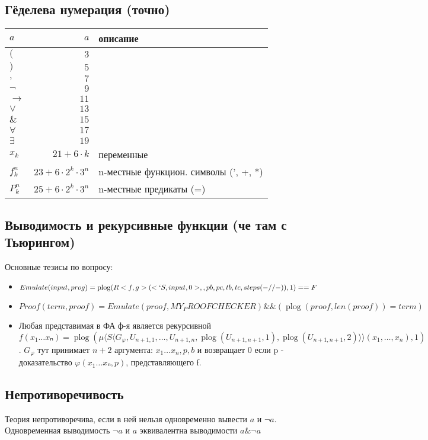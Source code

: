 \documentclass[12pt]{article}
\newcommand{\levayahuynya}{{\unicodefont \textopencorner}}
\newcommand{\pravayahuynya}{{\unicodefont \textcorner}}
\newcommand{\Godel}[1]{\levayahuynya #1\pravayahuynya}
\renewcommand{\phi}{\varphi}
\newcommand{\ltemplate}{\langle}
\newcommand{\rtemplate}{\rangle}
\newcommand{\template}[1]{\ltemplate #1\rtemplate}
\DeclareMathOperator{\plog}{plog}
\begin{document}
\subsection{Гёделева нумерация (точно)}
\label{sec-2-29}
\begin{center}
\begin{tabular}{lrl}
$a$ & \Godel{$a$} & описание\\
\hline
$($        & $3$ & \\
$)$        & $5$ & \\
$,$        & $7$ & \\
$\lnot$    & $9$ & \\
$\to$      & $11$ & \\
$\lor$     & $13$ & \\
$\&$       & $15$ & \\
$\forall$  & $17$ & \\
$\exists$  & $19$ & \\
$x_k$      & $21 + 6 \cdot k$ & переменные\\
$f^n_k$    & $23 + 6 \cdot 2^k \cdot 3^n$ & n-местные функцион. символы (', +, *)\\
$P^n_k$    & $25 + 6 \cdot 2^k \cdot 3^n$ & n-местные предикаты (=)\\
\hline
\end{tabular}
\end{center}

\subsection{Выводимость и рекурсивные функции (че там с Тьюрингом)}
\label{sec-2-30}
Основные тезисы по вопросу:
\begin{itemize}
\item $Emulate(input, prog) = \plog(R<f,g>(<`S, input, 0>,  , pb, pc, tb, tc, steps(-//-)), 1) == F$
\item $Proof(term, proof) = Emulate(proof, MY_PROOFCHECKER) \&\& (\plog(proof, len(proof)) = term)$
\item Любая представимая в ФА ф-я является рекурсивной
    $f(x_1\ldots{}xₙ) = \plog(μ\template{S\template{G_\phi, U_{n+1, 1}, \dotsc, U_{n+1, n},
    \plog(U_{n+1, n+1}, 1),
    \plog(U_{n+1, n+1}, 2)}}(x_1,\dotsc, x_n), 1)$.
$G_\phi$ тут принимает $n + 2$ аргумента: $x_1\ldots{}x_n, p, b$ и возвращает 0 если
p - доказательство $\phi(x_1\ldots{}xₙ, p)$, представляющего f.
\end{itemize}
\subsection{Непротиворечивость}
\label{sec-2-31}
Теория непротиворечива, если в ней нельзя одновременно
вывести $a$ и $\lnot a$.
Одновременная выводимость $\lnot a$ и $a$ эквивалентна выводимости
$a \& \lnot a$
\end{document}
